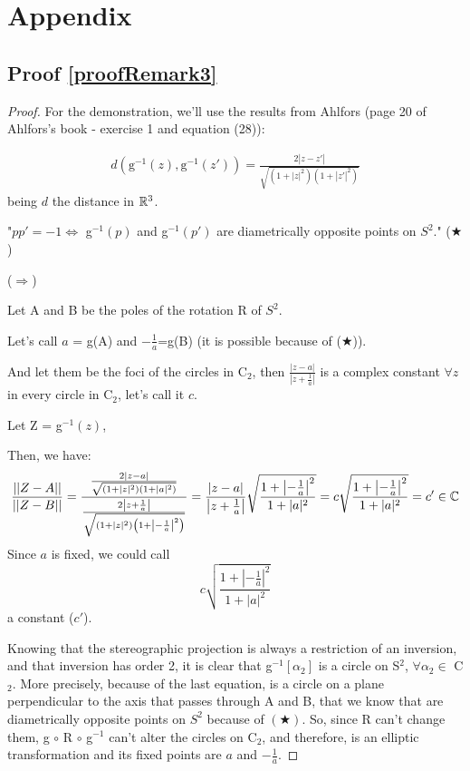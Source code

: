 \chapter{Appendix}\label{chp:apendices}

\section{Proof \ref{proofRemark3}}

\begin{proof} \label{proofRemark3}
For the demonstration, we'll use the results from Ahlfors (page 20 of \cite{Ahlfors}Ahlfors's book - exercise 1 and equation (28)):

\begin{gather*}
d(\mbox{g}^{-1}(z), \mbox{g}^{-1}(z')) = \frac{2|z-z'|}{\sqrt{(1+|z|^2)(1+|z'|^2)}}
\end{gather*}
being $d$ the distance in $\mathbb{R}^3$.

"$pp'=-1 \Leftrightarrow $ g$^{-1}(p)$ and g$^{-1}(p')$ are diametrically opposite points on $S^2$." ($\bigstar$)

\noindent($\Rightarrow$)

Let A and B be the poles of the rotation R of $S^2$.

Let's call $a$ = g(A) and $-\frac{1}{a}$=g(B) (it is possible because of ($\bigstar$)).

And let them be the foci of the circles in C$_2$, then $\frac{|z-a|}{|z+\frac{1}{a}|}$ is a complex constant $\forall z$ in every circle in C$_2$, let's call it $c$.

Let Z = g$^{-1}(z)$,

Then, we have:
\begin{gather*}
    \frac{||Z-A||}{||Z-B||}=\frac{\frac{2|z-a|}{\sqrt{(1+|z|^2)(1+|a|^2)}}}{\frac{2\left|z+\frac{1}{a}\right|}{\sqrt{(1+|z|^2)\left(1+\left|-\frac{1}{a}\right|^2\right)}}}=\frac{|z-a|}{\left|z+\frac{1}{a}\right|} \sqrt{\frac{1+\left|-\frac{1}{a}\right|^2}{1+|a|^2}}=c\sqrt{\frac{1+\left|-\frac{1}{a}\right|^2}{1+|a|^2}} = c' \in \mathbb{C}
\end{gather*}
Since $a$ is fixed, we could call
\begin{equation*}
c\sqrt{\frac{1+\left|-\frac{1}{a}\right|^2}{1+|a|^2}}    
\end{equation*}
a constant ($c'$).

Knowing that the stereographic projection is always a restriction of an inversion, and that inversion has order 2, it is clear that g$^{-1}[\alpha_2]$ is a circle on S$^2$, $\forall \alpha_2 \in$ C$_2$. More precisely, because of the last equation, is a circle on a plane perpendicular to the axis that passes through A and B, that we know that are diametrically opposite points on $S^2$ because of $(\bigstar)$. So, since R can't change them, g $\circ$ R $\circ$ g$^{-1}$ can't alter the circles on C$_2$, and therefore, is an elliptic transformation and its fixed points are $a$ and $-\frac{1}{a}$.


\end{proof}
